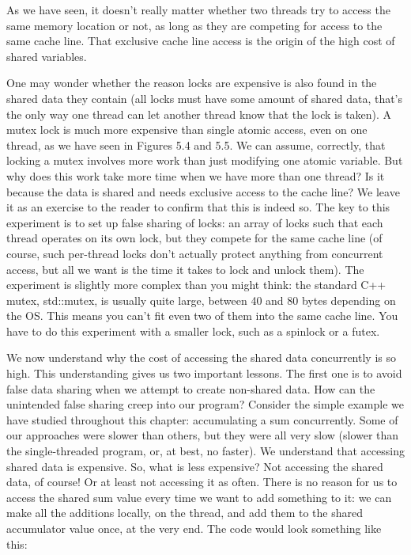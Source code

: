 As we have seen, it doesn't really matter whether two threads try to access the same memory location or not, as long as they are competing for access to the same cache line. That exclusive cache line access is the origin of the high cost of shared variables. 

One may wonder whether the reason locks are expensive is also found in the shared data they contain (all locks must have some amount of shared data, that's the only way one thread can let another thread know that the lock is taken). A mutex lock is much more expensive than single atomic access, even on one thread, as we have seen in Figures 5.4 and 5.5. We can assume, correctly, that locking a mutex involves more work than just modifying one atomic variable. But why does this work take more time when we have more than one thread? Is it because the data is shared and needs exclusive access to the cache line? We leave it as an exercise to the reader to confirm that this is indeed so. The key to this experiment is to set up false sharing of locks: an array of locks such that each thread operates on its own lock, but they compete for the same cache line (of course, such per-thread locks don't actually protect anything from concurrent access, but all we want is the time it takes to lock and unlock them). The experiment is slightly more complex than you might think: the standard C++ mutex, std::mutex, is usually quite large, between 40 and 80 bytes depending on the OS. This means you can't fit even two of them into the same cache line. You have to do this experiment with a smaller lock, such as a spinlock or a futex.

We now understand why the cost of accessing the shared data concurrently is so high. This understanding gives us two important lessons. The first one is to avoid false data sharing when we attempt to create non-shared data. How can the unintended false sharing creep into our program? Consider the simple example we have studied throughout this chapter: accumulating a sum concurrently. Some of our approaches were slower than others, but they were all very slow (slower than the single-threaded program, or, at best, no faster). We understand that accessing shared data is expensive. So, what is less expensive? Not accessing the shared data, of course! Or at least not accessing it as often. There is no reason for us to access the shared sum value every time we want to add something to it: we can make all the additions locally, on the thread, and add them to the shared accumulator value once, at the very end. The code would look something like this: 

